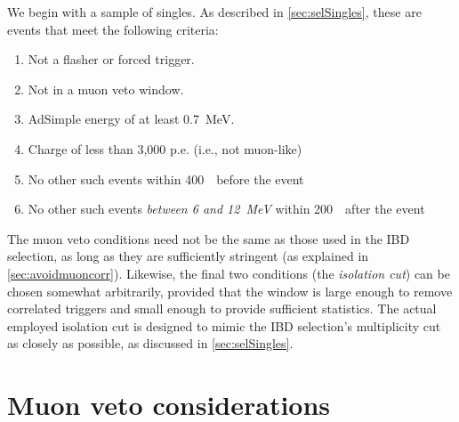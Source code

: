 \documentclass[../thesis.tex]{subfiles}
\begin{document}
We begin with a sample of singles. As described in \autoref{sec:selSingles}, these are events that meet the following criteria:

\begin{comment}
  This is the current state of the code:
  \begin{enumerate}
  \item Not a flasher or forced trigger.
  \item Not a muon.
  \item AdSimple energy of at least 0.7~MeV.
  \item No other events passing cuts 1-3 within time window $\pm t$.
  \item Not in a muon veto window.
  \end{enumerate}
  Below is what it should be. Why the difference? XXX Gotta correct for the
  lack-of-muon-vetoing-of-other in dmcEffSingles??? Or enhance the
  SinglesSelector to also pull events from ClusterTree, in case the ``extra'' is
  vetoed (YES, THIS)? We really need to think about whether the events we're
  ``isolating from'' are in the same class as ``this event''. If so then our
  cuts look like(?):
\end{comment}

\begin{enumerate}
\item Not a flasher or forced trigger.
\item Not in a muon veto window.
\item AdSimple energy of at least 0.7~MeV.
\item Charge of less than 3,000 p.e. (i.e., not muon-like)
\item No other such events within 400~\us\ before the event
\item No other such events \emph{between 6 and 12~MeV} within 200~\us\ after the event
\end{enumerate}

The muon veto conditions need not be the same as those used in the IBD selection, as long as they are sufficiently stringent (as explained in \autoref{sec:avoidmuoncorr}). Likewise, the final two conditions (the \emph{isolation cut}) can be chosen somewhat arbitrarily, provided that the window is large enough to remove correlated triggers and small enough to provide sufficient statistics. The actual employed isolation cut is designed to mimic the IBD selection's multiplicity cut as closely as possible, as discussed in \autoref{sec:selSingles}.

\section{Muon veto considerations}
\label{sec:muonventoconsider}
\end{document}
